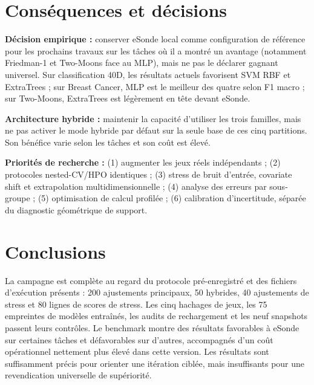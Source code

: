 \documentclass[11pt,a4paper]{article}
\begin{document}
\section{Conséquences et décisions}
\textbf{Décision empirique :} conserver eSonde local comme configuration de référence pour les prochains travaux sur les tâches où il a montré un avantage (notamment Friedman-1 et Two-Moons face au MLP), mais ne pas le déclarer gagnant universel. Sur classification 40D, les résultats actuels favorisent SVM RBF et ExtraTrees ; sur Breast Cancer, MLP est le meilleur des quatre selon F1 macro ; sur Two-Moons, ExtraTrees est légèrement en tête devant eSonde.

\textbf{Architecture hybride :} maintenir la capacité d'utiliser les trois familles, mais ne pas activer le mode hybride par défaut sur la seule base de ces cinq partitions. Son bénéfice varie selon les tâches et son coût est élevé.

\textbf{Priorités de recherche :} (1) augmenter les jeux réels indépendants ; (2) protocoles nested-CV/HPO identiques ; (3) stress de bruit d'entrée, covariate shift et extrapolation multidimensionnelle ; (4) analyse des erreurs par sous-groupe ; (5) optimisation de calcul profilée ; (6) calibration d'incertitude, séparée du diagnostic géométrique de support.

\section{Conclusions}
La campagne est complète au regard du protocole pré-enregistré et des fichiers d'exécution présents : 200 ajustements principaux, 50 hybrides, 40 ajustements de stress et 80 lignes de scores de stress. Les cinq hachages de jeux, les 75 empreintes de modèles entraînés, les audits de rechargement et les neuf snapshots passent leurs contrôles. Le benchmark montre des résultats favorables à eSonde sur certaines tâches et défavorables sur d'autres, accompagnés d'un coût opérationnel nettement plus élevé dans cette version. Les résultats sont suffisamment précis pour orienter une itération ciblée, mais insuffisants pour une revendication universelle de supériorité.
\end{document}
